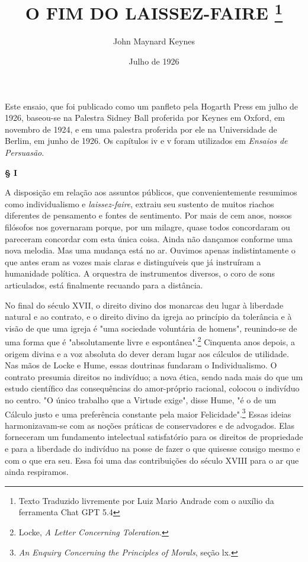 \documentclass[12pt]{article}
\title{O FIM DO LAISSEZ-FAIRE \thanks{Texto Traduzido livremente por Luiz Mario Andrade com o auxílio da ferramenta Chat GPT 5.4}}
\author{John Maynard Keynes}
\date{Julho de 1926}
\begin{document}
\maketitle

Este ensaio, que foi publicado como um panfleto pela Hogarth Press em julho de 1926, baseou-se na Palestra Sidney Ball proferida por Keynes em Oxford, em novembro de 1924, e em uma palestra proferida por ele na Universidade de Berlim, em junho de 1926. Os capítulos iv e v foram utilizados em \textit{Ensaios de Persuasão}.

\begin{center}
\textbf{§ I}
\end{center}

A disposição em relação aos assuntos públicos, que convenientemente resumimos como individualismo e \textit{laissez-faire}, extraiu seu sustento de muitos riachos diferentes de pensamento e fontes de sentimento. Por mais de cem anos, nossos filósofos nos governaram porque, por um milagre, quase todos concordaram ou pareceram concordar com esta única coisa. Ainda não dançamos conforme uma nova melodia. Mas uma mudança está no ar. Ouvimos apenas indistintamente o que antes eram as vozes mais claras e distinguíveis que já instruíram a humanidade política. A orquestra de instrumentos diversos, o coro de sons articulados, está finalmente recuando para a distância.

No final do século XVII, o direito divino dos monarcas deu lugar à liberdade natural e ao contrato, e o direito divino da igreja ao princípio da tolerância e à visão de que uma igreja é "uma sociedade voluntária de homens", reunindo-se de uma forma que é "absolutamente livre e espontânea".\footnote{Locke, \textit{A Letter Concerning Toleration}.} Cinquenta anos depois, a origem divina e a voz absoluta do dever deram lugar aos cálculos de utilidade. Nas mãos de Locke e Hume, essas doutrinas fundaram o Individualismo. O contrato presumia direitos no indivíduo; a nova ética, sendo nada mais do que um estudo científico das consequências do amor-próprio racional, colocou o indivíduo no centro. "O único trabalho que a Virtude exige", disse Hume, "é o de um Cálculo justo e uma preferência constante pela maior Felicidade".\footnote{\textit{An Enquiry Concerning the Principles of Morals}, seção lx.} Essas ideias harmonizavam-se com as noções práticas de conservadores e de advogados. Elas forneceram um fundamento intelectual satisfatório para os direitos de propriedade e para a liberdade do indivíduo na posse de fazer o que quisesse consigo mesmo e com o que era seu. Essa foi uma das contribuições do século XVIII para o ar que ainda respiramos.
\end{document}
